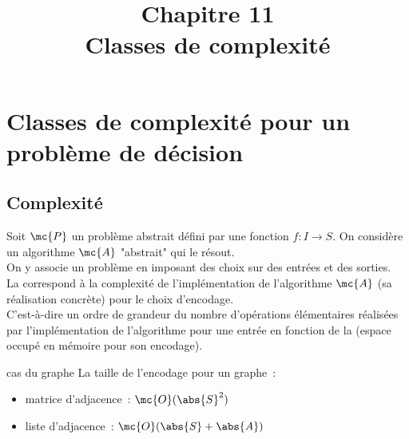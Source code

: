 

\setcounter{chapitre}{11}

\title{\Large Chapitre 11 \\ \Huge Classes de complexité}



\maketitle


\section{Classes de complexité pour un problème de décision}
\subsection{Complexité}

\newcommand{\pbm}{\mc{P}}
\newcommand{\algo}{\mc{A}}
\newcommand{\reductibleP}{\leq_m^\mr{P}}
\newcommand{\troissat}{\textbf{3-SAT}\,}
\newcommand{\deuxsat}{\textbf{2-SAT}\,}
\newcommand{\cnfsat}{\textbf{CNF-SAT}\,}
\newcommand{\sat}{\textbf{SAT}\,}
\newcommand{\cheminham}{\textbf{CHEMIN-HAM}\,}
\newcommand{\cycleham}{\textbf{CYCLE-HAM}\,}


\begin{definition}{}{}
    Soit $\mc{P}$ un problème abstrait défini par une fonction $f:I\to S$. On considère un algorithme $\mc{A}$ "abstrait" qui le résout.\\
    On y associe un problème  en imposant des choix sur  des entrées et des sorties.\\
    La  correspond à la complexité de l'implémentation de l'algorithme $\algo$ (sa réalisation concrète) pour le choix d'encodage.\\
    C'est-à-dire un ordre de grandeur du nombre d'opérations élémentaires réalisées par l'implémentation de l'algorithme pour une entrée en fonction de la  (espace occupé en mémoire pour son encodage).
\end{definition}

\begin{remarque}{}{cas du graphe}
    La taille de l'encodage pour un graphe~:
    \begin{itemize}
        \item matrice d'adjacence~: $\mc{O}(\abs{S}^2)$
        \item liste d'adjacence~: $\mc{O}(\abs{S} + \abs{A})$
    \end{itemize}
\end{remarque}

